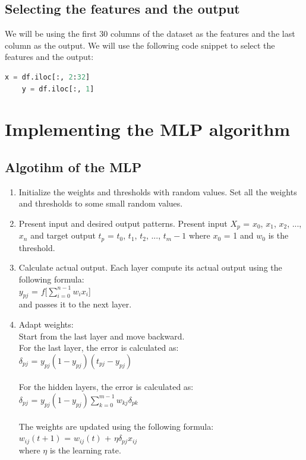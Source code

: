 \subsection{Selecting the features and the output}
We will be using the first 30 columns of the dataset as the features and the last column as the output. We will use the following code snippet to select the features and the output:
\begin{lstlisting}[language=Python]
    x = df.iloc[:, 2:32]
    y = df.iloc[:, 1]
\end{lstlisting}
\section{Implementing the MLP algorithm}
\subsection{Algotihm of the MLP}
\begin{enumerate}
    \item Initialize the weights and thresholds with random values.
    Set all the weights and thresholds to some small random values.
    \item Present input and desired output patterns.
    Present input $X_p$ = $x_0$, $x_1$, $x_2$, ..., $x_n$ and target output $t_p$ = $t_0$, $t_1$, $t_2$, ..., $t_m-1$ where $x_0$ = 1 and $w_0$ is the threshold.
    \item Calculate actual output.
    Each layer compute its actual output using the following formula:\\
    $y_{pj}$ = $f$[$\sum_{i=0}^{n-1} w_{i}x_{i}$]\\
    and passes it to the next layer.
    \item Adapt weights:\\
    Start from the last layer and move backward.\\
    For the last layer, the error is calculated as:\\
    $\delta_{pj}$ = $y_{pj}(1-y_{pj})(t_{pj}-y_{pj})$\\\\
    For the hidden layers, the error is calculated as:\\
    $\delta_{pj}$ = $y_{pj}(1-y_{pj})\sum_{k=0}^{m-1} w_{kj}\delta_{pk}$\\\\
    The weights are updated using the following formula:\\
    $w_{ij}(t+1)$ = $w_{ij}(t)$ + $\eta\delta_{pj}x_{ij}$\\
    where $\eta$ is the learning rate.\\\\
\end{enumerate}
